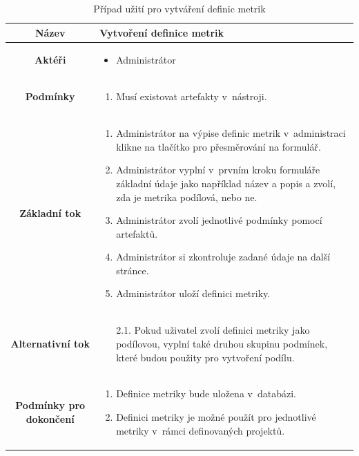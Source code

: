 \documentclass[czech,master]{diploma}
\begin{document}
\begin{table}[htp]
\begin{center}
\begin{tabular}{c | m{10cm}}

\textbf{Název} & Vytvoření definice metrik \\ 
\hline
\textbf{Aktéři} & 
\begin{itemize}
\item Administrátor
\end{itemize}
\\ 
\hline
\textbf{Podmínky} & 
\begin{enumerate}
\item Musí existovat artefakty v~nástroji.
\end{enumerate}
 
\\ 
\hline
\textbf{Základní tok} &                                                                              
\begin{enumerate}
\item Administrátor na výpise definic metrik v~administraci klikne na tlačítko pro přesměrování na formulář.
\item Administrátor vyplní v~prvním kroku formuláře základní údaje jako například název a popis a zvolí, zda je metrika podílová, nebo ne.
\item Administrátor zvolí jednotlivé podmínky pomocí artefaktů.
\item Administrátor si zkontroluje zadané údaje na další stránce.
\item Administrátor uloží definici metriky.
\end{enumerate}                                                                                        \\ 
\hline

\textbf{Alternativní tok} &            
\begin{itemize}
    \item [2.1.] Pokud uživatel zvolí definici metriky jako podílovou, vyplní také druhou skupinu podmínek, které budou použity pro vytvoření podílu.
\end{itemize}
\\ 
\hline

\textbf{Podmínky pro dokončení} & 
\begin{enumerate}
\item Definice metriky bude uložena v~databázi.
\item Definici metriky je možné použít pro jednotlivé metriky v~rámci definovaných projektů.
\end{enumerate}                                                                                          
\end{tabular}
\caption{Případ užití pro vytváření definic metrik}
\label{tab:use_case_definition_metric}
\end{center}
\end{table}
\end{document}
